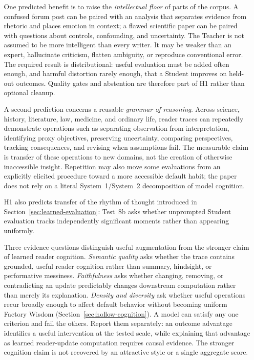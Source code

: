 \documentclass[11pt]{article}
\begin{document}
One predicted benefit is to raise the \emph{intellectual floor} of parts of the corpus. A confused forum post can be paired with an analysis that separates evidence from rhetoric and places emotion in context; a flawed scientific paper can be paired with questions about controls, confounding, and uncertainty. The Teacher is not assumed to be more intelligent than every writer. It may be weaker than an expert, hallucinate criticism, flatten ambiguity, or reproduce conventional error. The required result is distributional: useful evaluation must be added often enough, and harmful distortion rarely enough, that a Student improves on held-out outcomes. Quality gates and abstention are therefore part of H1 rather than optional cleanup.

A second prediction concerns a reusable \emph{grammar of reasoning}. Across science, history, literature, law, medicine, and ordinary life, reader traces can repeatedly demonstrate operations such as separating observation from interpretation, identifying proxy objectives, preserving uncertainty, comparing perspectives, tracking consequences, and revising when assumptions fail. The measurable claim is transfer of these operations to new domains, not the creation of otherwise inaccessible insight. Repetition may also move some evaluations from an explicitly elicited procedure toward a more accessible default habit; the paper does not rely on a literal System~1/System~2 decomposition of model cognition.

H1 also predicts transfer of the rhythm of thought introduced in
Section~\ref{sec:learned-evaluation}: Test~8b asks whether unprompted Student
evaluation tracks independently significant moments rather than appearing
uniformly.

Three evidence questions distinguish useful augmentation from the stronger claim of learned reader cognition. \emph{Semantic quality} asks whether the trace contains grounded, useful reader cognition rather than summary, hindsight, or performative messiness. \emph{Faithfulness} asks whether changing, removing, or contradicting an update predictably changes downstream computation rather than merely its explanation. \emph{Density and diversity} ask whether useful operations recur broadly enough to affect default behavior without becoming uniform Factory Wisdom (Section~\ref{sec:hollow-cognition}). A model can satisfy any one criterion and fail the others. Report them separately: an
outcome advantage identifies a useful intervention at the tested scale, while
explaining that advantage as learned reader-update computation requires causal
evidence. The stronger cognition claim is not recovered by an attractive style
or a single aggregate score.
\end{document}
